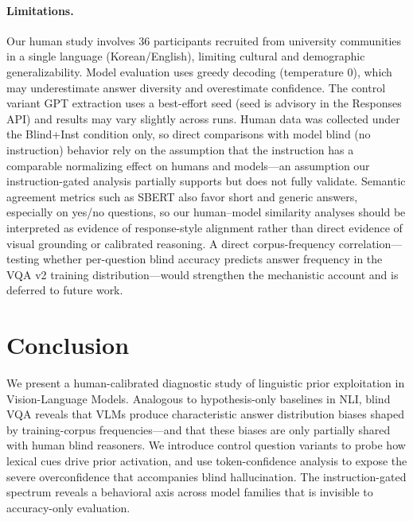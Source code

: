 \documentclass[letterpaper]{article}
\begin{document}
\paragraph{Limitations.}
Our human study involves 36 participants recruited from university communities
in a single language (Korean/English), limiting cultural and demographic
generalizability. Model evaluation uses greedy decoding (temperature 0), which
may underestimate answer diversity and overestimate confidence. The control
variant GPT extraction uses a best-effort seed (seed is advisory in the
Responses API) and results may vary slightly across runs. Human data was
collected under the Blind+Inst condition only, so direct comparisons with model
blind (no instruction) behavior rely on the assumption that the instruction
has a comparable normalizing effect on humans and models---an assumption our
instruction-gated analysis partially supports but does not fully validate.
Semantic agreement metrics such as SBERT also favor short and generic answers,
especially on yes/no questions, so our human--model similarity analyses should
be interpreted as evidence of response-style alignment rather than direct
evidence of visual grounding or calibrated reasoning.
A direct corpus-frequency correlation---testing whether per-question blind accuracy
predicts answer frequency in the VQA v2 training distribution---would strengthen the
mechanistic account \citep{mccoy2024embers} and is deferred to future work.

\section{Conclusion}

We present a human-calibrated diagnostic study of linguistic prior exploitation
in Vision-Language Models. Analogous to hypothesis-only baselines in NLI, blind
VQA reveals that VLMs produce characteristic answer distribution biases shaped
by training-corpus frequencies---and that these biases are only partially shared
with human blind reasoners. We introduce control question variants to probe how
lexical cues drive prior activation, and use token-confidence analysis to
expose the severe overconfidence that accompanies blind hallucination. The
instruction-gated spectrum reveals a behavioral axis across model families that
is invisible to accuracy-only evaluation.
\end{document}
